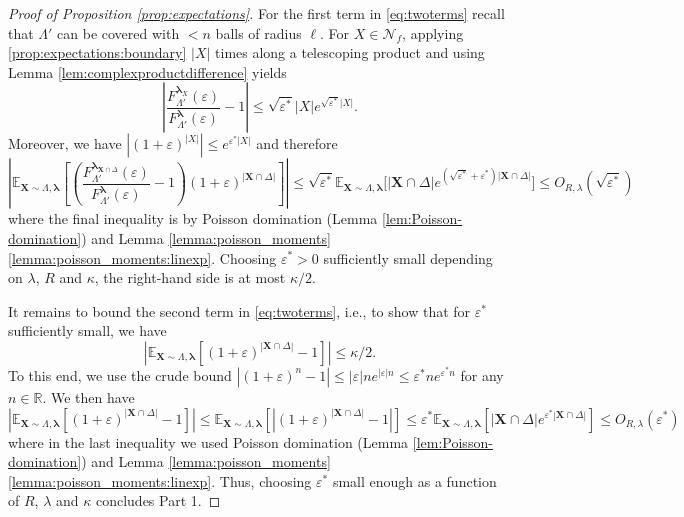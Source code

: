 \documentclass[10pt]{amsart}
\theoremstyle{definition}
\theoremstyle{remark}
\def\eps{{\varepsilon}}
\newcommand{\pointsets}{\mathcal{N}}
\newcommand{\bX}{\mathbf{X}}
\newcommand{\E}{\mathbb{E}}
\newcommand{\region}{\Lambda}
\newcommand{\activity}{\lambda}
\newcommand{\activities}{\pmb{\lambda}}
\newcommand{\size}[1]{\left\lvert#1\right\rvert}
\newcommand{\absolute}[1]{\left\lvert#1\right\rvert}
\newcommand{\epsbound}{\varepsilon^{*}}
\begin{document}
\begin{proof}[Proof of Proposition \ref{prop:expectations}]
		For the first term in \eqref{eq:twoterms} recall that $\region'$ can be covered with $< n$ balls of radius $\ell$.
		For $X \in \pointsets_f$, applying \ref{prop:expectations:boundary}  $\size{X}$ times along a telescoping product and using Lemma \ref{lem:complexproductdifference} yields
		\[
		\absolute{\frac{F_{\region'}^{\activities_{X}}(\varepsilon)}{F_{\region'}^{\activities}(\varepsilon)} - 1} \le \sqrt{\epsbound} \size{X}  e^{\sqrt{\epsbound}  \size{X}} .
		\]
		Moreover, we have $|(1+\eps)^{|X|}|\leq e^{\epsbound |X|}$ and therefore
		\[
		\absolute{\E_{\bX \sim \region, \activities} \left[\left(\frac{F_{\region'}^{\activities_{\bX \cap\Delta}}(\varepsilon)}{F_{\region'}^{\activities}(\varepsilon)} - 1\right)  (1 + \varepsilon)^{\size{\bX \cap \Delta}} \right]}
		\le
		\sqrt{\epsbound} \E_{\bX \sim \region, \activities}\big[\size{\bX \cap \Delta}  e^{ (\sqrt{\epsbound}+\epsbound) \size{\bX \cap \Delta}}\big] \le   O_{R,\lambda}(\sqrt{\eps^\ast})
		\]
		where the final inequality is  by Poisson domination (Lemma \ref{lem:Poisson-domination}) and Lemma \ref{lemma:poisson_moments} \ref{lemma:poisson_moments:linexp}.
		Choosing $\epsbound > 0$ sufficiently small depending on $\activity$, $R$ and $\kappa$, the right-hand side is at most $\kappa/2$.
		
		
		It remains to bound the second term in \eqref{eq:twoterms}, i.e., to show that for $\epsbound$ sufficiently small, we have
		\[
		\absolute{\E_{\bX \sim \region, \activities}[(1 + \varepsilon)^{\size{\bX \cap \Delta}} - 1]} \le \kappa/2.
		\]
		To this end, we use the crude bound
		$
		\absolute{(1 + \varepsilon)^{n} - 1} \le \absolute{\varepsilon} n e^{\absolute{\varepsilon} n} \le \epsbound n e^{\epsbound n} 
		$ for any $n \in \mathbb{R}$. 
		We then have
		\[
		\absolute{\E_{\bX \sim \region, \activities}\left[(1 + \varepsilon)^{\size{\bX \cap \Delta}} - 1\right]} \le \E_{\bX \sim \region, \activities}\left[\absolute{(1 + \varepsilon)^{\size{\bX \cap \Delta}} - 1 } \right]\le \epsbound \E_{\bX \sim \region, \activities}\left[ \size{\bX \cap \Delta} e^{\epsbound \size{\bX \cap \Delta}} \right] \leq O_{R,\lambda}(\epsbound)
		\]
		where in the last inequality we used 
		Poisson domination (Lemma \ref{lem:Poisson-domination}) and Lemma \ref{lemma:poisson_moments} \ref{lemma:poisson_moments:linexp}.
		Thus, choosing $\epsbound$ small enough as a function of $R$, $\activity$ and $\kappa$ concludes Part 1.
		
		\medskip 
		

\end{proof}
\end{document}
